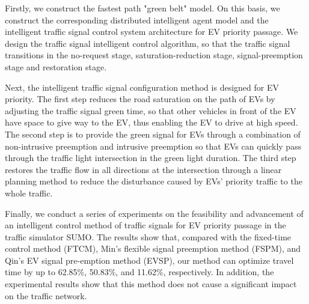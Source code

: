 
Firstly, we construct the fastest path "green belt" model. On this basis, we construct the corresponding distributed intelligent agent model and the intelligent traffic signal control system architecture for EV priority passage.  We design the traffic signal intelligent control algorithm, so that the traffic signal transitions in the no-request stage, saturation-reduction stage, signal-preemption stage and restoration stage.

Next, the intelligent traffic signal configuration method is designed for EV priority. The first step reduces the road saturation on the path of EVs by adjusting the traffic signal green time, so that other vehicles in front of the EV have space to give way to the EV, thus enabling the EV to drive at high speed. The second step is to provide the green signal for EVs through a combination of non-intrusive preemption and intrusive preemption so that EVs can quickly pass through the traffic light intersection in the green light duration. The third step restores the traffic flow in all directions at the intersection through a linear planning method to reduce the disturbance caused by EVs' priority traffic to the whole traffic.


Finally, we conduct a series of experiments on the feasibility and advancement of an intelligent control method of traffic signals for EV priority passage in the traffic simulator SUMO. The results show that, compared with the fixed-time control method (FTCM), Min's flexible signal preemption method (FSPM), and Qin's EV signal pre-emption method (EVSP), our method can optimize travel time by up to 62.85\%, 50.83\%, and 11.62\%, respectively. In addition, the experimental results show that this method does not cause a significant impact on the traffic network.




